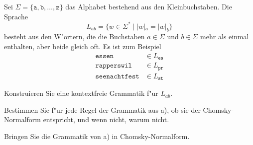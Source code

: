 Sei $\Sigma=\{\texttt{a},\texttt{b},\dots,\texttt{z}\}$ das Alphabet
bestehend aus den Kleinbuchstaben.
Die Sprache
\[
L_{ab}=\{w\in\Sigma^*\;|\; |w|_a=|w|_b\}
\]
besteht aus den W"ortern, die die Buchstaben $a\in \Sigma$ und $b\in\Sigma$
mehr als einmal enthalten, aber beide gleich oft.
Es ist zum Beispiel
\begin{align*}
\texttt{essen}&\in L_{\texttt{es}}\\
\texttt{rapperswil}&\in L_{\texttt{pr}}\\
\texttt{seenachtfest}&\in L_{\texttt{st}}
\end{align*}
\begin{teilaufgaben}
\item
Konstruieren Sie eine kontextfreie Grammatik f"ur $L_{ab}$.
\item
Bestimmen Sie f"ur jede Regel der Grammatik aus a), ob sie der
Chomsky-Normalform entspricht, und wenn nicht, warum nicht.
\item
Bringen Sie die Grammatik von a) in Chomsky-Normalform.
\end{teilaufgaben}

